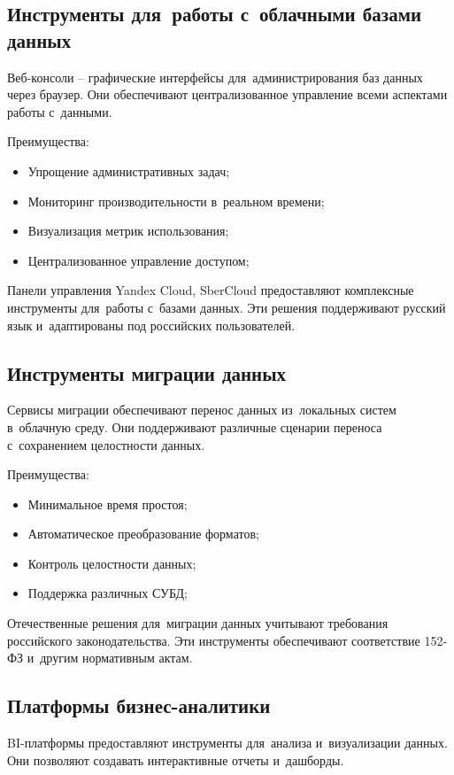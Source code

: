 \documentclass{ou}
\begin{document}
\subsection{Инструменты для~работы с~облачными базами данных}
Веб-консоли -- графические интерфейсы для~администрирования баз данных через браузер. Они обеспечивают централизованное управление всеми аспектами работы с~данными.

Преимущества:
\begin{itemize}[label=-, leftmargin=0em, itemindent=3.35em, nosep]
\item Упрощение административных задач;
\item Мониторинг производительности в~реальном времени;
\item Визуализация метрик использования;
\item Централизованное управление доступом;
\end{itemize}

Панели управления Yandex Cloud, SberCloud предоставляют комплексные инструменты для~работы с~базами данных. Эти решения поддерживают русский язык и~адаптированы под российских пользователей.
\subsection{Инструменты миграции данных}
Сервисы миграции обеспечивают перенос данных из~локальных систем в~облачную среду. Они поддерживают различные сценарии переноса с~сохранением целостности данных.

Преимущества:
\begin{itemize}[label=-, leftmargin=0em, itemindent=3.35em, nosep]
\item Минимальное время простоя;
\item Автоматическое преобразование форматов;
\item Контроль целостности данных;
\item Поддержка различных СУБД;
\end{itemize}

Отечественные решения для~миграции данных учитывают требования российского законодательства. Эти инструменты обеспечивают соответствие 152-ФЗ и~другим нормативным актам.
\subsection{Платформы бизнес-аналитики}
BI-платформы предоставляют инструменты для~анализа и~визуализации данных. Они позволяют создавать интерактивные отчеты и~дашборды.
\end{document}
